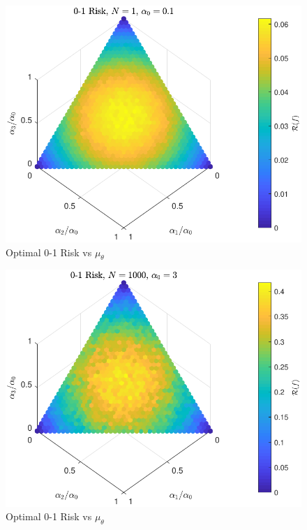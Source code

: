 \documentclass[12pt]{report}
\begin{document}
\begin{figure}
\centering
\includegraphics[scale=1.0]{Risk_01_Dir_muTheta_N_1_a0_01.pdf}
\caption{Optimal 0-1 Risk vs $\mu_{\theta}$}
\label{fig:Risk_01_Dir_muTheta_N_1_a0_01}
\end{figure}

\begin{figure}
\centering
\includegraphics[scale=1.0]{Risk_01_Dir_muTheta_N_1000_a0_3.pdf}
\caption{Optimal 0-1 Risk vs $\mu_{\theta}$}
\label{fig:Risk_01_Dir_muTheta_N_1000_a0_3}
\end{figure}
\end{document}
